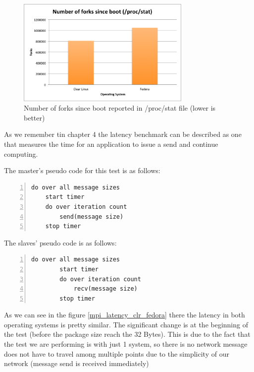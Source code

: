 \begin{figure}[H]
\centering
\includegraphics[width=0.75\textwidth]{images/number_forks.png}
\caption{Number of forks since boot reported in /proc/stat file (lower is better)}
\label{number_forks_fedora_clr}
\end{figure}

As we remember tin chapter 4 the latency benchmark can be described as one that
measures the time for an application to issue a send and continue computing.

The master's pseudo code for this test is as follows:

\begin{lstlisting}[frame=single,numbers=left]
do over all message sizes 
    start timer
    do over iteration count 
        send(message size) 
    stop timer
\end{lstlisting}    

The slaves' pseudo code is as follows:

\begin{lstlisting}[frame=single,numbers=left]
   do over all message sizes 
        start timer
        do over iteration count 
            recv(message size) 
        stop timer
\end{lstlisting}


As we can see in the figure \ref{mpi_latency_clr_fedora} there the latency in
both operating systems is pretty similar. The significant change is at the
beginning of the test (before the package size reach the 32 Bytes). This is due
to the fact that the test we are performing is with just 1 system, so there is
no network message does not have to travel among multiple points due to the
simplicity of our network (message send is received immediately) 

